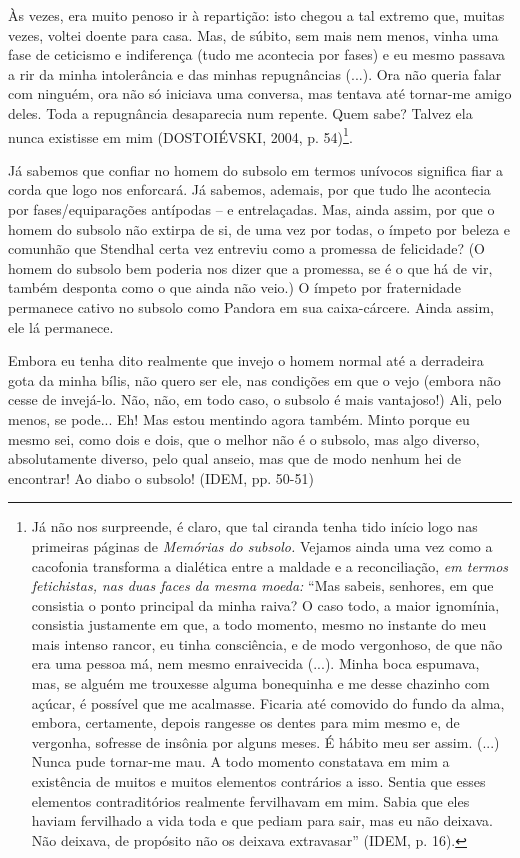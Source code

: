Às vezes, era muito penoso ir à repartição: isto chegou a tal extremo
que, muitas vezes, voltei doente para casa. Mas, de súbito, sem mais nem
menos, vinha uma fase de ceticismo e indiferença (tudo me acontecia por
fases) e eu mesmo passava a rir da minha intolerância e das minhas
repugnâncias (...). Ora não queria falar com ninguém, ora não só
iniciava uma conversa, mas tentava até tornar-me amigo deles. Toda a
repugnância desaparecia num repente. Quem sabe? Talvez ela nunca
existisse em mim (DOSTOIÉVSKI, 2004, p. 54)\footnote{Já não nos
  surpreende, é claro, que tal ciranda tenha tido início logo nas
  primeiras páginas de \emph{Memórias do subsolo.} Vejamos ainda uma vez
  como a cacofonia transforma a dialética entre a maldade e a
  reconciliação, \emph{em termos fetichistas, nas duas faces da mesma
  moeda:} ``Mas sabeis, senhores, em que consistia o ponto principal da
  minha raiva? O caso todo, a maior ignomínia, consistia justamente em
  que, a todo momento, mesmo no instante do meu mais intenso rancor, eu
  tinha consciência, e de modo vergonhoso, de que não era uma pessoa má,
  nem mesmo enraivecida (...). Minha boca espumava, mas, se alguém me
  trouxesse alguma bonequinha e me desse chazinho com açúcar, é possível
  que me acalmasse. Ficaria até comovido do fundo da alma, embora,
  certamente, depois rangesse os dentes para mim mesmo e, de vergonha,
  sofresse de insônia por alguns meses. É hábito meu ser assim. (...)
  Nunca pude tornar-me mau. A todo momento constatava em mim a
  existência de muitos e muitos elementos contrários a isso. Sentia que
  esses elementos contraditórios realmente fervilhavam em mim. Sabia que
  eles haviam fervilhado a vida toda e que pediam para sair, mas eu não
  deixava. Não deixava, de propósito não os deixava extravasar'' (IDEM,
  p. 16).}.

Já sabemos que confiar no homem do subsolo em termos unívocos significa
fiar a corda que logo nos enforcará. Já sabemos, ademais, por que tudo
lhe acontecia por fases/equiparações antípodas -- e entrelaçadas. Mas,
ainda assim, por que o homem do subsolo não extirpa de si, de uma vez
por todas, o ímpeto por beleza e comunhão que Stendhal certa vez
entreviu como a promessa de felicidade? (O homem do subsolo bem poderia
nos dizer que a promessa, se é o que há de vir, também desponta como o
que ainda não veio.) O ímpeto por fraternidade permanece cativo no
subsolo como Pandora em sua caixa-cárcere. Ainda assim, ele lá
permanece.

Embora eu tenha dito realmente que invejo o homem normal até a
derradeira gota da minha bílis, não quero ser ele, nas condições em que
o vejo (embora não cesse de invejá-lo. Não, não, em todo caso, o subsolo
é mais vantajoso!) Ali, pelo menos, se pode... Eh! Mas estou mentindo
agora também. Minto porque eu mesmo sei, como dois e dois, que o melhor
não é o subsolo, mas algo diverso, absolutamente diverso, pelo qual
anseio, mas que de modo nenhum hei de encontrar! Ao diabo o subsolo!
(IDEM, pp. 50-51)

